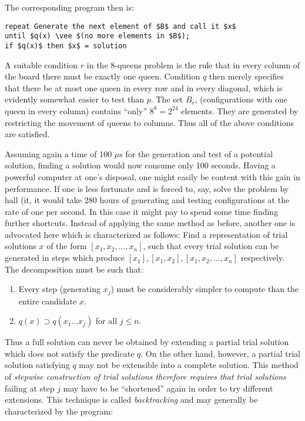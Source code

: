 The corresponding program then is:

\begin{lstlisting}[basicstyle=\small\normalfont]
repeat Generate the next element of $B$ and call it $x$
until $q(x) \vee $(no more elements in $B$);
if $q(x)$ then $x$ = solution
\end{lstlisting}

A suitable condition $r$ in the 8-queens problem is the rule that in every
column of the board there must be exactly one queen.  Condition $q$ then merely
specifies that there be at most one queen in every row and in every diagonal,
which is evidently somewhat easier to test than $p$.  The set $B_r$,
(configurations with one queen in every column) contains ``only'' $8^8 =
2^{24}$ elements.  They are generated by restricting the movement of queens to
columns.  Thus all of the above conditions are satisfied.

Assuming again a time of 100 $\mu$s for the generation and test of a potential
solution, finding a solution would now consume only 100 seconds.  Having a
powerful computer at one's disposal, one might easily be content with this gain
in performance.  If one is less fortunate and is forced to, say, solve the
problem by hall (it, it would take 280 hours of generating and testing
configurations at the rate of one per second.  In this case it might pay to
spend some time finding further shortcuts.  Instead of applying the same method
as before, another one is advocated here which is characterized as follows:
Find a representation of trial solutions $x$ of the form $[x_1, x_2, \ldots
,x_n]$, such that every trial solution can be generated in steps which produce
$[x_1], [x_1, x_2], [x_1, x_2, \ldots , x_n]$ respectively.  The decomposition
must be such that:

\begin{enumerate}
    \item Every step (generating $x_j$) must be considerably simpler to compute
          than the entire candidate $x$.
    \item $q(x) \supset q(x_1 \ldots x_j)$ for all $j \leq n$.
\end{enumerate}

Thus a full solution can never be obtained by extending a partial trial
solution which does not satisfy the predicate $q$.  On the other hand, however,
a partial trial solution satisfying $q$ may not be extensible into a complete
solution.  This method of \emph{stepwise construction of trial solutions
therefore requires that trial solutions} failing at step $j$ may have to be
``shortened'' again in order to try different extensions.  This technique is
called \emph{backtracking} and may generally be characterized by the program:

